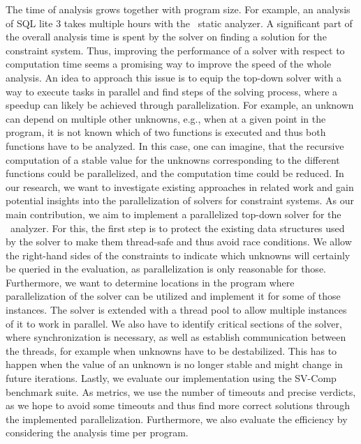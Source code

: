 The time of analysis grows together with program size. For example, an analysis of SQL lite 3 takes multiple hours with the \gob\ static analyzer. A significant part of the overall analysis time is spent by the solver on finding a solution for the constraint system. Thus, improving the performance of a solver with respect to computation time seems a promising way to improve the speed of the whole analysis. An idea to approach this issue is to equip the top-down solver with a way to execute tasks in parallel and find steps of the solving process, where a speedup can likely be achieved through parallelization. For example, an unknown can depend on multiple other unknowns, e.g., when at a given point in the program, it is not known which of two functions is executed and thus both functions have to be analyzed. In this case, one can imagine, that the recursive computation of a stable value for the unknowns corresponding to the different functions could be parallelized, and the computation time could be reduced.
In our research, we want to investigate existing approaches in related work and gain potential insights into the parallelization of solvers for constraint systems.
As our main contribution, we aim to implement a parallelized top-down solver for the \gob\ analyzer.
For this, the first step is to protect the existing data structures used by the solver to make them thread-safe and thus avoid race conditions. We allow the right-hand sides of the constraints to indicate which unknowns will certainly be queried in the evaluation, as parallelization is only reasonable for those. Furthermore, we want to determine locations in the program where parallelization of the solver can be utilized and implement it for some of those instances. The solver is extended with a thread pool to allow multiple instances of it to work in parallel. We also have to identify critical sections of the solver, where synchronization is necessary, as well as establish communication between the threads, for example when unknowns have to be destabilized. This has to happen when the value of an unknown is no longer stable and might change in future iterations.
Lastly, we evaluate our implementation using the SV-Comp benchmark suite. As metrics, we use the number of timeouts and precise verdicts, as we hope to avoid some timeouts and thus find more correct solutions through the implemented parallelization. Furthermore, we also evaluate the efficiency by considering the analysis time per program.
